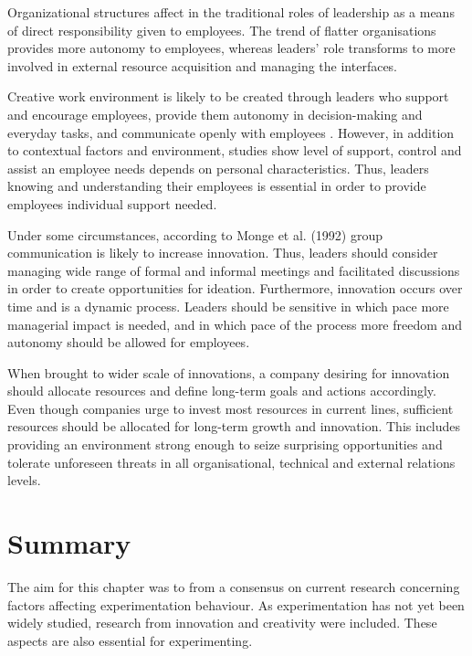 Organizational structures affect in the traditional roles of leadership as a means of direct responsibility given to employees. The trend of flatter organisations provides more autonomy to employees, whereas leaders' role transforms to more involved in external resource acquisition and managing the interfaces. \citep{shalley2004leaders}

Creative work environment is likely to be created through leaders who support and encourage employees, provide them autonomy in decision-making and everyday tasks, and communicate openly with employees \citep{oldham1996employee,tierney1999examination}. However, in addition to contextual factors and environment, studies show level of support, control and assist an employee needs depends on personal characteristics. Thus, leaders knowing and understanding their employees is essential in order to provide employees individual support needed. \citep{shalley2004leaders}

Under some circumstances, according to Monge et al. (1992) \citet{monge1992communication} group communication is likely to increase innovation. Thus, leaders should consider managing wide range of formal and informal meetings and facilitated discussions in order to create opportunities for ideation. Furthermore, innovation occurs over time and is a dynamic process. Leaders should be sensitive in which pace more managerial impact is needed, and in which pace of the process more freedom and autonomy should be allowed for employees. \citep{monge1992communication} 

When brought to wider scale of innovations, a company desiring for innovation should allocate resources and define long-term goals and actions accordingly. Even though companies urge to invest most resources in current lines, sufficient resources should be allocated for long-term growth and innovation. This includes providing an environment strong enough to seize surprising opportunities and tolerate unforeseen threats in all organisational, technical and external relations levels. \citep{quinn1985managing} 

\section{Summary}
The aim for this chapter was to from a consensus on current research concerning factors affecting experimentation behaviour. As experimentation has not yet been widely studied, research from innovation and creativity were included. These aspects are also essential for experimenting.  

